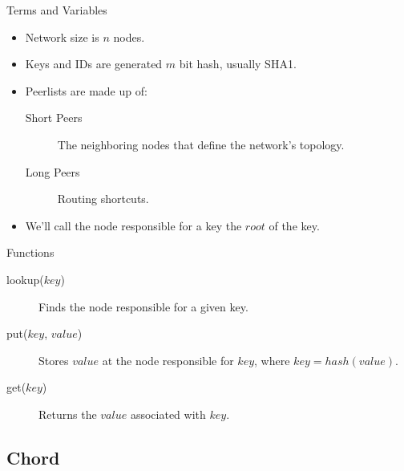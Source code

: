 \documentclass[11pt]{beamer}
\begin{document}
\begin{frame}{Terms and Variables}
	\begin{itemize}
		\item Network size is $n$ nodes.
		\item Keys and IDs are generated $m$ bit hash, usually SHA1.
		\item Peerlists are made up of:
		\begin{description}
			\item[Short Peers] The neighboring nodes that define the network's topology.
			\item[Long Peers] Routing shortcuts.
		\end{description}
		\item We'll call the node responsible for a key the $ root $ of the key.
	\end{itemize}
\end{frame}







\begin{frame}{Functions}
	\begin{description}
		\item[lookup($ key $)] Finds the node responsible for a given key.
		\item[put($ key $, $ value $)] Stores $value$ at the node responsible for $key$, where $key =  hash(value)$.
		\item[get($ key $)] Returns the $ value $ associated with $key$.
	\end{description}
\end{frame}






\subsection{Chord}
\end{document}
